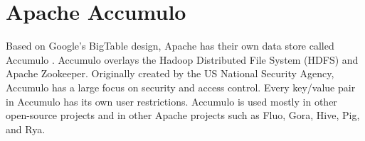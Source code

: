 \section{Apache Accumulo}

Based on Google's BigTable design, Apache has their own
data store called Accumulo \cite{hid-sp18-526-www-apache-accumulo}.
Accumulo overlays the Hadoop Distributed File System (HDFS) and
Apache Zookeeper. Originally created by the US National Security
Agency, Accumulo has a large focus on security and access control. 
Every key/value pair in Accumulo has its own user restrictions. 
Accumulo is used mostly in other open-source projects and in other 
Apache projects such as Fluo, Gora, Hive, Pig, and Rya.

